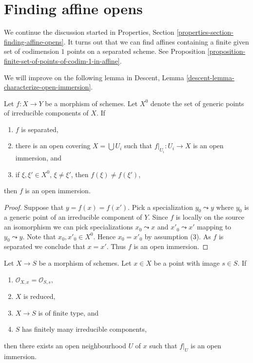 \section{Finding affine opens}
\label{section-finding-affine-opens}

\noindent
We continue the discussion started in
Properties, Section \ref{properties-section-finding-affine-opens}.
It turns out that we can find affines containing a finite given set
of codimension $1$ points on a separated scheme. See
Proposition \ref{proposition-finite-set-of-points-of-codim-1-in-affine}.

\medskip\noindent
We will improve on the following lemma in
Descent, Lemma \ref{descent-lemma-characterize-open-immersion}.

\begin{lemma}
\label{lemma-characterize-open-immersion}
Let $f : X \to Y$ be a morphism of schemes. Let $X^0$ denote the set
of generic points of irreducible components of $X$. If
\begin{enumerate}
\item $f$ is separated,
\item there is an open covering $X = \bigcup U_i$ such that
$f|_{U_i} : U_i \to X$ is an open immersion, and
\item if $\xi, \xi' \in X^0$, $\xi \not = \xi'$, then $f(\xi) \not = f(\xi')$,
\end{enumerate}
then $f$ is an open immersion.
\end{lemma}

\begin{proof}
Suppose that $y = f(x) = f(x')$. Pick a specialization $y_0 \leadsto y$
where $y_0$ is a generic point of an irreducible component of $Y$.
Since $f$ is locally on the source an isomorphism we can pick specializations
$x_0 \leadsto x$ and $x'_0 \leadsto x'$ mapping to $y_0 \leadsto y$.
Note that $x_0, x'_0 \in X^0$. Hence $x_0 = x'_0$ by assumption (3).
As $f$ is separated we conclude that $x = x'$. Thus $f$ is an open immersion.
\end{proof}

\begin{lemma}
\label{lemma-local-isomorphism}
Let $X \to S$ be a morphism of schemes. Let $x \in X$ be a point with
image $s \in S$. If
\begin{enumerate}
\item $\mathcal{O}_{X, x} = \mathcal{O}_{S, s}$,
\item $X$ is reduced,
\item $X \to S$ is of finite type, and
\item $S$ has finitely many irreducible components,
\end{enumerate}
then there exists an open neighbourhood $U$
of $x$ such that $f|_U$ is an open immersion.
\end{lemma}

